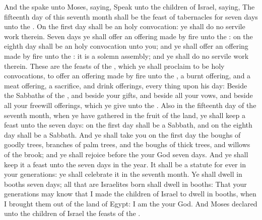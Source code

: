 \begin{biblechapter}
 And the \LORD spake unto Moses, saying,
\verse Speak unto the children of Israel, saying, The fifteenth day of this seventh month shall be the feast of tabernacles for seven days unto the \LORD.
\verse On the first day shall be an holy convocation: ye shall do no servile work therein.
\verse Seven days ye shall offer an offering made by fire unto the \LORD: on the eighth day shall be an holy convocation unto you; and ye shall offer an offering made by fire unto the \LORD: it is a solemn assembly; and ye shall do no servile work therein.
\verse These are the feasts of the \LORD, which ye shall proclaim to be holy convocations, to offer an offering made by fire unto the \LORD, a burnt offering, and a meat offering, a sacrifice, and drink offerings, every thing upon his day:
\verse Beside the Sabbaths of the \LORD, and beside your gifts, and beside all your vows, and beside all your freewill offerings, which ye give unto the \LORD.
\verse Also in the fifteenth day of the seventh month, when ye have gathered in the fruit of the land, ye shall keep a feast unto the \LORD seven days: on the first day shall be a Sabbath, and on the eighth day shall be a Sabbath.
\verse And ye shall take you on the first day the boughs of goodly trees, branches of palm trees, and the boughs of thick trees, and willows of the brook; and ye shall rejoice before the \LORD your God seven days.
\verse And ye shall keep it a feast unto the \LORD seven days in the year. It shall be a statute for ever in your generations: ye shall celebrate it in the seventh month.
\verse Ye shall dwell in booths seven days; all that are Israelites born shall dwell in booths:
\verse That your generations may know that I made the children of Israel to dwell in booths, when I brought them out of the land of Egypt: I am the \LORD your God.
\verse And Moses declared unto the children of Israel the feasts of the \LORD.
\end{biblechapter}

